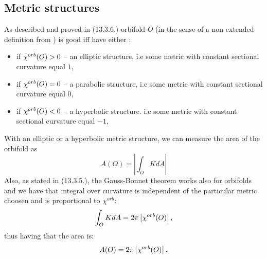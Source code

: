 \subsection{Metric structures}
As described and proved in \cite{Thurston1979} (13.3.6.) orbifold $O$ (in the sense of 
a non-extended definition from \cite{Thurston1979})
is good iff 
have
either 
:
\begin{itemize}
\item if ${\chi^{orb}(O)} > 0$ -- an elliptic structure, i.e some metric with constant sectional 
curvature equal $1$,  
\item if ${\chi^{orb}(O)} = 0$ -- a parabolic structure, i.e some metric with constant sectional 
curvature equal $0$,
\item if ${\chi^{orb}(O)} < 0$ -- a hyperbolic structure. i.e some metric with constant sectional 
curvature equal $-1$,
\end{itemize}

With an elliptic or a hyperbolic metric structure, we can measure the area of the orbifold as 
\begin{equation}
A(O) = \left|\int_O K dA\right|
\end{equation} 
Also, as stated in \cite{Thurston1979} (13.3.5.), the Gauss-Bonnet 
theorem works also for orbifolds 
and we have that integral over curvature is independent of the particular metric choosen 
and is proportional to $\chi^{orb}$:
\begin{equation}
\int_O K dA = 2\pi\left|{\chi^{orb}(O)}\right|,
\end{equation}
thus having that the area is:
\begin{equation}\label{area to chi}
A(O) = 2\pi\left|{\chi^{orb}(O)}\right|.
\end{equation}

